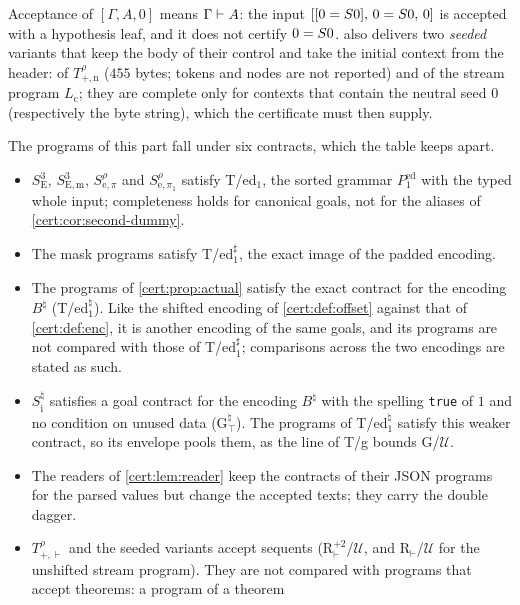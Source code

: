 Acceptance of $[\Gamma,A,0]$ means $\Gamma\vdash A$: the input
$[[0=S 0],\,0=S 0,\,0]$ is accepted with a hypothesis leaf, and it does not certify
$0=S 0$.  also delivers two \emph{seeded} variants that keep
the body of their control and take the initial context from the header: of
$T^{\rho}_{+,\mathrm n}$ ($455$ bytes; tokens and nodes are not reported) and of the stream
program $L_{\mathrm c}$; they are complete only for contexts that contain the neutral
seed $0$ (respectively the byte string), which the certificate must then supply.

\begin{remark}\label{cert:rem:new-contracts}
The programs of this part fall under six contracts, which the table keeps apart.
\begin{itemize}
\item $S^{3}_{\mathrm E}$, $S^{3}_{\mathrm{E,m}}$, $S^{\rho}_{\mathrm e,\pi}$ and
$S^{\rho}_{\mathrm e,\pi_1}$ satisfy T/ed$_1$, the sorted grammar $P^{\mathrm{ed}}_{1}$
with the typed whole input; completeness holds for canonical goals, not for the aliases
of \cref{cert:cor:second-dummy}.
\item The mask programs satisfy T/ed$_1^{\sharp}$, the exact image of the padded encoding.
\item The programs of \cref{cert:prop:actual} satisfy the exact contract for the encoding
$B^{\natural}$ (T/ed$_1^{\natural}$). Like the shifted encoding of \cref{cert:def:offset}
against that of \cref{cert:def:enc}, it is another encoding of the same goals, and its
programs are not compared with those of T/ed$_1^{\sharp}$; comparisons across the two
encodings are stated as such.
\item $S^{\natural}_{\mathrm i}$ satisfies a goal contract for the encoding $B^{\natural}$
with the spelling \texttt{true} of $1$ and no condition on unused data
(G$^{\natural}_{\top}$). The programs of T/ed$_1^{\natural}$ satisfy this weaker contract,
so its envelope pools them, as the line of T/g bounds G/$\mathcal U$.
\item The readers of \cref{cert:lem:reader} keep the contracts of their JSON programs for
the parsed values but change the accepted texts; they carry the double dagger.
\item $T^{\rho}_{+,\vdash}$ and the seeded variants accept sequents
(R$^{+2}_{\vdash}$/$\mathcal U$, and R$_{\vdash}$/$\mathcal U$ for the unshifted stream
program). They are not compared with programs that accept theorems: a program of a theorem

\end{itemize}
\end{remark}
